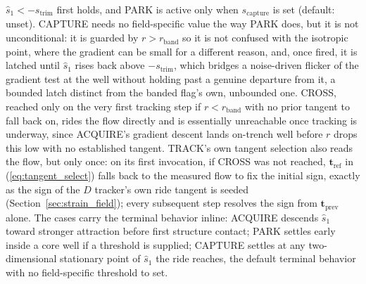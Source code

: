\documentclass[lettersize,journal]{IEEEtran}
\begin{document}
$\hat{s}_1 < -s_{\text{trim}}$ first holds, and PARK is active only
when $s_{\text{capture}}$ is set (default: unset). CAPTURE needs no
field-specific value the way PARK does, but it is not unconditional: it
is guarded by $r > r_{\text{band}}$ so it is not confused with the
isotropic point, where the gradient can be small for a different
reason, and, once fired, it is latched until $\hat{s}_1$ rises back
above $-s_{\text{trim}}$, which bridges a noise-driven flicker of the
gradient test at the well without holding past a genuine departure from
it, a bounded latch distinct from the banded flag's own, unbounded one.
CROSS, reached only on the very first tracking step if $r <
r_{\text{band}}$ with no prior tangent to fall back on, rides the flow
directly and is essentially unreachable once tracking is underway,
since ACQUIRE's gradient descent lands on-trench well before $r$ drops
this low with no established tangent. TRACK's own tangent selection
also reads the flow, but only once: on its first invocation, if CROSS
was not reached, $\mathbf{t}_{\text{ref}}$ in (\ref{eq:tangent_select})
falls back to the measured flow to fix the initial sign, exactly as the
sign of the $D$ tracker's own ride tangent is seeded
(Section~\ref{sec:strain_field}); every subsequent step resolves the
sign from $\mathbf{t}_{\text{prev}}$ alone. The cases carry the terminal
behavior inline: ACQUIRE descends $\hat{s}_1$ toward stronger attraction
before first structure contact; PARK settles early inside a core well if
a threshold is supplied; CAPTURE settles at any two-dimensional
stationary point of $\hat{s}_1$ the ride reaches, the default terminal
behavior with no field-specific threshold to set.
\end{document}
